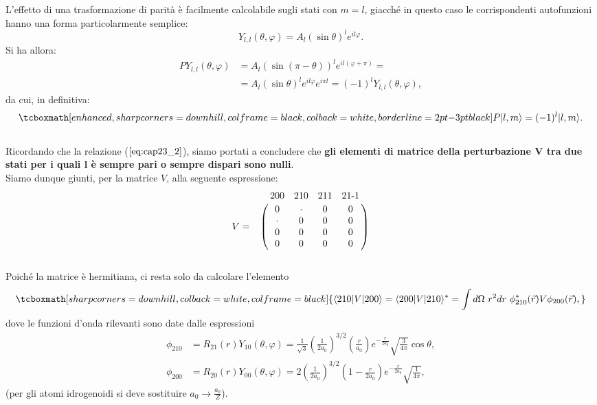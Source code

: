 \documentclass[a4paper,12pt,oneside]{book}
\begin{document}
L'effetto di una trasformazione di parità è facilmente calcolabile sugli stati con $m=l$, giacché in questo caso le corrispondenti autofunzioni hanno una forma particolarmente semplice:
	\begin{equation} 
		Y_{l,l}(\theta, \varphi)=A_l \left( \sin \theta \right)^l e^{il\varphi}.
	\end{equation}
Si ha allora:
	\begin{align} 
		PY_{l,l}(\theta, \varphi) & =   A_l \left( \sin (\pi -\theta) \right)^l e^{il(\varphi+\pi)}= \nonumber \\
		 & =   A_l \left( \sin \theta \right)^l e^{il\varphi} e^{i \pi l}= (-1)^l Y_{l,l}(\theta, \varphi),
	\end{align}
da cui, in definitiva:
	\begin{equation} 
		\tcboxmath[enhanced, sharp corners=downhill, colframe=black, colback=white, borderline={2pt}{-3pt}{black}]{
			P|l,m\rangle= (-1)^l |l,m \rangle.
			}
	\end{equation}\\
	
Ricordando che la relazione ($\ref{eq:cap23_2}$), siamo portati a concludere che \textbf{gli elementi di matrice della perturbazione $\boldsymbol{V}$ tra due stati per i quali $\boldsymbol{l}$ è sempre pari o sempre dispari sono nulli}.\\

Siamo dunque giunti, per la matrice $V$, alla seguente espressione:
	\begin{equation}  
		V=
			\bordermatrix{~&200&210&211&21\textrm{-}1\cr
			& 0 & \cdot & 0 & 0 \cr
			& \cdot & 0 & 0 & 0 \cr
			& 0 & 0 & 0 & 0 \cr
			& 0 & 0 & 0 & 0 \cr}
	\end{equation}\\

Poiché la matrice è hermitiana, ci resta solo da calcolare l'elemento 
	\begin{equation}
	\label{eq:cap23_3}
		\tcboxmath[sharp corners=downhill, colback=white, colframe=black]{
			\langle 210| V |200 \rangle =  \langle 200| V |210 \rangle^* = \int d\Omega \ r^2 dr \ \phi_{210}^*(\vec{r}) V \phi_{200}(\vec{r}),
			}
	\end{equation}
dove le funzioni d'onda rilevanti sono date dalle espressioni
	\begin{align} 
		\phi_{210}& = R_{21}(r)Y_{10}(\theta, \varphi)=  \frac{1}{\sqrt{3}}\left( \frac{1}{2a_0} \right)^{3/2} \left( \frac{r}{a_0} \right) e^{-\frac{r}{2a_0}} \sqrt{\frac{3}{4 \pi}} \cos \theta , \\
		\phi_{200}& =  R_{20}(r)Y_{00}(\theta, \varphi)= 2\left( \frac{1}{2a_0} \right)^{3/2} \left( 1-\frac{r}{2a_0} \right) e^{-\frac{r}{2a_0}} \sqrt{\frac{1}{4 \pi}} ,
	\end{align}
(per gli atomi idrogenoidi si deve sostituire $a_0 \to \frac{a_0}{Z}$).\\
\end{document}
